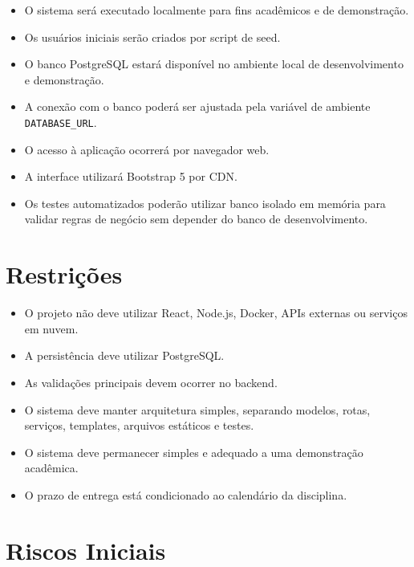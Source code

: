 \documentclass[12pt,a4paper]{article}
\begin{document}
\begin{itemize}
    \item O sistema será executado localmente para fins acadêmicos e de demonstração.
    \item Os usuários iniciais serão criados por script de seed.
    \item O banco PostgreSQL estará disponível no ambiente local de desenvolvimento e demonstração.
    \item A conexão com o banco poderá ser ajustada pela variável de ambiente \texttt{DATABASE\_URL}.
    \item O acesso à aplicação ocorrerá por navegador web.
    \item A interface utilizará Bootstrap 5 por CDN.
    \item Os testes automatizados poderão utilizar banco isolado em memória para validar regras de negócio sem depender do banco de desenvolvimento.
\end{itemize}

\section{Restrições}

\begin{itemize}
    \item O projeto não deve utilizar React, Node.js, Docker, APIs externas ou serviços em nuvem.
    \item A persistência deve utilizar PostgreSQL.
    \item As validações principais devem ocorrer no backend.
    \item O sistema deve manter arquitetura simples, separando modelos, rotas, serviços, templates, arquivos estáticos e testes.
    \item O sistema deve permanecer simples e adequado a uma demonstração acadêmica.
    \item O prazo de entrega está condicionado ao calendário da disciplina.
\end{itemize}

\section{Riscos Iniciais}
\end{document}
